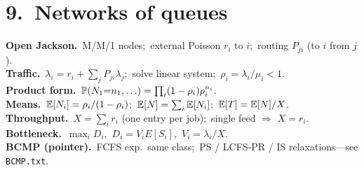 \section*{9.\ Networks of queues}
\textbf{Open Jackson.}\ M/M/1 nodes;\ external Poisson $r_i$ to $i$;\ routing $P_{ji}$ (to $i$ from $j$).\\
\textbf{Traffic.}\ $\lambda_i=r_i+\sum_j P_{ji}\lambda_j$;\ solve linear system;\ $\rho_i=\lambda_i/\mu_i<1$.\\
\textbf{Product form.}\ $\mathbb{P}(N_1{=}n_1,\ldots)=\prod_i(1-\rho_i)\rho_i^{n_i}$.\\
\textbf{Means.}\ $\mathbb{E}[N_i]=\rho_i/(1-\rho_i)$;\ $\mathbb{E}[N]=\sum_i\mathbb{E}[N_i]$;\ $\mathbb{E}[T]=\mathbb{E}[N]/X$.\\
\textbf{Throughput.}\ $X=\sum_i r_i$ (one entry per job);\ single feed $\Rightarrow$ $X=r_i$.\\
\textbf{Bottleneck.}\ $\max_i D_i$,\ $D_i=V_iE[S_i]$,\ $V_i=\lambda_i/X$.\\
\textbf{BCMP (pointer).}\ FCFS exp.\ same class;\ PS / LCFS-PR / IS relaxations---see \texttt{BCMP.txt}.
